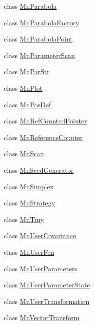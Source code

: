 \begin{DoxyCompactItemize}
\item 
class \mbox{\hyperlink{classROOT_1_1Minuit2_1_1MnParabola}{Mn\+Parabola}}
\item 
class \mbox{\hyperlink{classROOT_1_1Minuit2_1_1MnParabolaFactory}{Mn\+Parabola\+Factory}}
\item 
class \mbox{\hyperlink{classROOT_1_1Minuit2_1_1MnParabolaPoint}{Mn\+Parabola\+Point}}
\item 
class \mbox{\hyperlink{classROOT_1_1Minuit2_1_1MnParameterScan}{Mn\+Parameter\+Scan}}
\item 
class \mbox{\hyperlink{classROOT_1_1Minuit2_1_1MnParStr}{Mn\+Par\+Str}}
\item 
class \mbox{\hyperlink{classROOT_1_1Minuit2_1_1MnPlot}{Mn\+Plot}}
\item 
class \mbox{\hyperlink{classROOT_1_1Minuit2_1_1MnPosDef}{Mn\+Pos\+Def}}
\item 
class \mbox{\hyperlink{classROOT_1_1Minuit2_1_1MnRefCountedPointer}{Mn\+Ref\+Counted\+Pointer}}
\item 
class \mbox{\hyperlink{classROOT_1_1Minuit2_1_1MnReferenceCounter}{Mn\+Reference\+Counter}}
\item 
class \mbox{\hyperlink{classROOT_1_1Minuit2_1_1MnScan}{Mn\+Scan}}
\item 
class \mbox{\hyperlink{classROOT_1_1Minuit2_1_1MnSeedGenerator}{Mn\+Seed\+Generator}}
\item 
class \mbox{\hyperlink{classROOT_1_1Minuit2_1_1MnSimplex}{Mn\+Simplex}}
\item 
class \mbox{\hyperlink{classROOT_1_1Minuit2_1_1MnStrategy}{Mn\+Strategy}}
\item 
class \mbox{\hyperlink{classROOT_1_1Minuit2_1_1MnTiny}{Mn\+Tiny}}
\item 
class \mbox{\hyperlink{classROOT_1_1Minuit2_1_1MnUserCovariance}{Mn\+User\+Covariance}}
\item 
class \mbox{\hyperlink{classROOT_1_1Minuit2_1_1MnUserFcn}{Mn\+User\+Fcn}}
\item 
class \mbox{\hyperlink{classROOT_1_1Minuit2_1_1MnUserParameters}{Mn\+User\+Parameters}}
\item 
class \mbox{\hyperlink{classROOT_1_1Minuit2_1_1MnUserParameterState}{Mn\+User\+Parameter\+State}}
\item 
class \mbox{\hyperlink{classROOT_1_1Minuit2_1_1MnUserTransformation}{Mn\+User\+Transformation}}
\item 
class \mbox{\hyperlink{classROOT_1_1Minuit2_1_1MnVectorTransform}{Mn\+Vector\+Transform}}
\item 

\end{DoxyCompactItemize}
